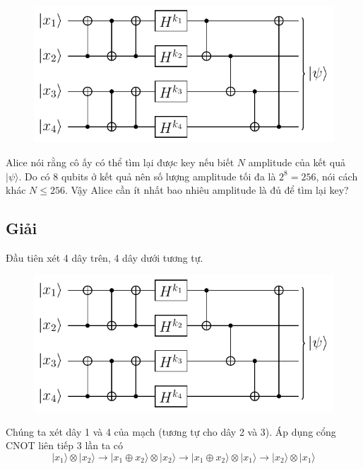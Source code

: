 \begin{figure}[ht]
    \centering
    \includegraphics[page=2]{nsucrypto/2023/problem10_figures.pdf}
\end{figure}
Alice nói rằng cô ấy có thể tìm lại được key nếu biết $N$ amplitude của kết quả $\lvert \psi \rangle$. Do có 8 qubits ở kết quả nên số lượng amplitude tối đa là $2^8 = 256$, nói cách khác $N \leqslant 256$. Vậy Alice cần ít nhất bao nhiêu amplitude là đủ để tìm lại key?

\subsection*{Giải}

Đầu tiên xét 4 dây trên, 4 dây dưới tương tự.

\begin{figure}[ht]
    \centering
    \includegraphics[page=3]{nsucrypto/2023/problem10_figures.pdf}
\end{figure}
Chúng ta xét dây 1 và 4 của mạch (tương tự cho dây 2 và 3). Áp dụng cổng CNOT liên tiếp 3 lần ta có
\begin{equation*}
    \lvert x_1 \rangle \otimes \lvert x_2 \rangle \to \lvert x_1 \oplus x_2 \rangle \otimes \lvert x_2 \rangle \to \lvert x_1 \oplus x_2 \rangle \otimes \lvert x_1 \rangle \to \lvert x_2 \rangle \otimes \lvert x_1 \rangle
\end{equation*}


